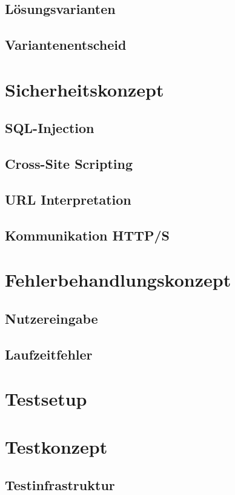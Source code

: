 \subsection{Lösungsvarianten}
\subsection{Variantenentscheid}

\section{Sicherheitskonzept}
\subsection{SQL-Injection}
\subsection{Cross-Site Scripting}
\subsection{URL Interpretation}
\subsection{Kommunikation HTTP/S}

\section{Fehlerbehandlungskonzept}
\subsection{Nutzereingabe}
\subsection{Laufzeitfehler}

\section{Testsetup}

\section{Testkonzept}
\subsection{Testinfrastruktur}
